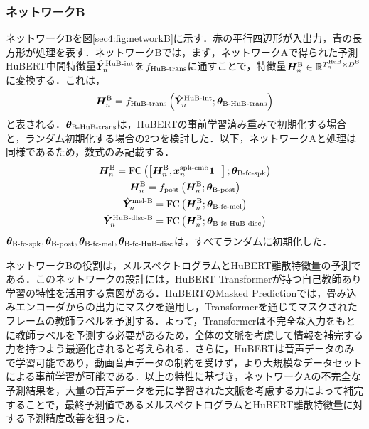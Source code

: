 \subsubsection{ネットワークB}
ネットワークBを図\ref{sec4:fig:networkB}に示す．赤の平行四辺形が入出力，青の長方形が処理を表す．ネットワークBでは，まず，ネットワークAで得られた予測HuBERT中間特徴量$\hat{\bm{Y}}^{\text{HuB-int}}_{n}$を$f_{\text{HuB-trans}}$に通すことで，特徴量$\bm{H}^{\text{B}}_{n} \in \mathbb{R}^{T^{\text{HuB}}_{n} \times D^{\text{B}}}$に変換する．これは，
\begin{equation}
    \bm{H}^{\text{B}}_{n} = f_{\text{HuB-trans}}\left(\hat{\bm{Y}}^{\text{HuB-int}}_{n}; \bm{\theta}_{\text{B-HuB-trans}}\right)
\end{equation}
と表される．$\bm{\theta}_{\text{B-HuB-trans}}$は，HuBERTの事前学習済み重みで初期化する場合と，ランダム初期化する場合の2つを検討した．以下，ネットワークAと処理は同様であるため，数式のみ記載する．
\begin{gather}
    \bm{H}^{\text{B}}_{n} = \text{FC}\left(\left[\bm{H}^{\text{B}}_{n}, \bm{x}^{\text{spk-emb}}_{n} \bm{1}^{\top}\right]; \bm{\theta}_{\text{B-fc-spk}}\right) \\
    \bm{H}^{\text{B}}_{n} = f_{\text{post}}\left(\bm{H}^{\text{B}}_{n}; \bm{\theta}_{\text{B-post}}\right) \\
    \hat{\bm{Y}}^{\text{mel-B}}_{n} = \text{FC}\left(\bm{H}^{\text{B}}_{n}; \bm{\theta}_{\text{B-fc-mel}}\right) \\
    \hat{\bm{Y}}^{\text{HuB-disc-B}}_{n} = \text{FC}\left(\bm{H}^{\text{B}}_{n}; \bm{\theta}_{\text{B-fc-HuB-disc}}\right)
\end{gather}
$\bm{\theta}_{\text{B-fc-spk}}, \bm{\theta}_{\text{B-post}}, \bm{\theta}_{\text{B-fc-mel}}, \bm{\theta}_{\text{B-fc-HuB-disc}}$は，すべてランダムに初期化した．

ネットワークBの役割は，メルスペクトログラムとHuBERT離散特徴量の予測である．このネットワークの設計には，HuBERT Transformerが持つ自己教師あり学習の特性を活用する意図がある．HuBERTのMasked Predictionでは，畳み込みエンコーダからの出力にマスクを適用し，Transformerを通じてマスクされたフレームの教師ラベルを予測する．よって，Transformerは不完全な入力をもとに教師ラベルを予測する必要があるため，全体の文脈を考慮して情報を補完する力を持つよう最適化されると考えられる．さらに，HuBERTは音声データのみで学習可能であり，動画音声データの制約を受けず，より大規模なデータセットによる事前学習が可能である．以上の特性に基づき，ネットワークAの不完全な予測結果を，大量の音声データを元に学習された文脈を考慮する力によって補完することで，最終予測値であるメルスペクトログラムとHuBERT離散特徴量に対する予測精度改善を狙った．

